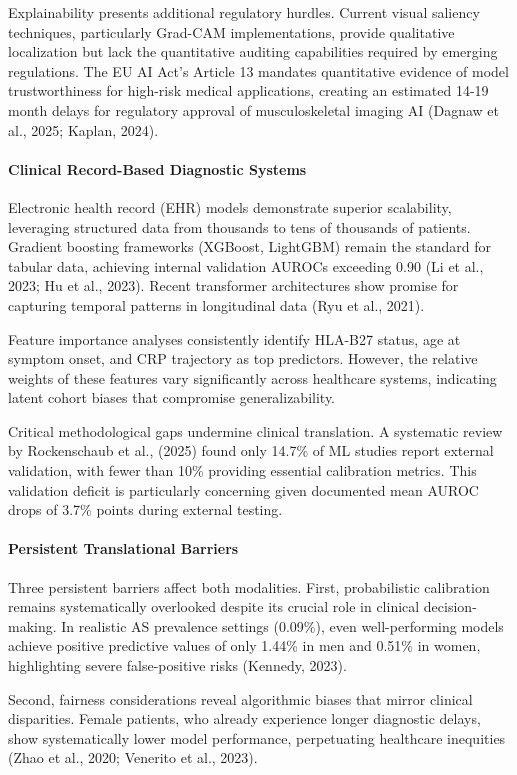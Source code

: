 \documentclass[12pt, a4paper]{article}
\begin{document}
Explainability presents additional regulatory hurdles. Current visual saliency techniques, particularly Grad-CAM implementations, provide qualitative localization but lack the quantitative auditing capabilities required by emerging regulations. The EU AI Act's Article 13 mandates quantitative evidence of model trustworthiness for high-risk medical applications, creating an estimated 14-19 month delays for regulatory approval of musculoskeletal imaging AI (Dagnaw et al., 2025; Kaplan, 2024).

\paragraph{Clinical Record-Based Diagnostic Systems}
Electronic health record (EHR) models demonstrate superior scalability, leveraging structured data from thousands to tens of thousands of patients. Gradient boosting frameworks (XGBoost, LightGBM) remain the standard for tabular data, achieving internal validation AUROCs exceeding 0.90 (Li et al., 2023; Hu et al., 2023). Recent transformer architectures show promise for capturing temporal patterns in longitudinal data (Ryu et al., 2021).

Feature importance analyses consistently identify HLA-B27 status, age at symptom onset, and CRP trajectory as top predictors. However, the relative weights of these features vary significantly across healthcare systems, indicating latent cohort biases that compromise generalizability.

Critical methodological gaps undermine clinical translation. A systematic review by Rockenschaub et al., (2025) found only 14.7\% of ML studies report external validation, with fewer than 10\% providing essential calibration metrics. This validation deficit is particularly concerning given documented mean AUROC drops of 3.7\% points during external testing.

\paragraph{Persistent Translational Barriers}
Three persistent barriers affect both modalities. First, probabilistic calibration remains systematically overlooked despite its crucial role in clinical decision-making. In realistic AS prevalence settings (0.09\%), even well-performing models achieve positive predictive values of only 1.44\% in men and 0.51\% in women, highlighting severe false-positive risks (Kennedy, 2023).

Second, fairness considerations reveal algorithmic biases that mirror clinical disparities. Female patients, who already experience longer diagnostic delays, show systematically lower model performance, perpetuating healthcare inequities (Zhao et al., 2020; Venerito et al., 2023).
\end{document}
